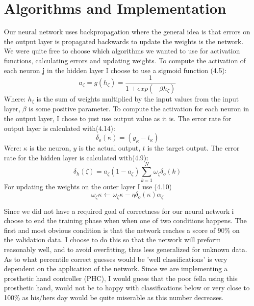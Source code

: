 \documentclass[a4paper, norsk, 12pt]{article}
\begin{document}
\section{Algorithms and Implementation}
Our neural network uses backpropagation where the general idea is that errors on the output layer is propagated backwards to update the weights is the network. We were quite free to choose which algorithms we wanted to use for activation functions, calculating errors and updating weights. To compute the activation of each neuron \textbf{j} in the hidden layer I choose to use a sigmoid function (4.5): 
$$ a_ \zeta  =  g(h_\zeta) = \frac{\mathrm{1} }{\mathrm{1} + exp(- \beta h_\zeta ) }  $$
Where: \newline
$h_\zeta$ is the sum of weights multiplied by the input values from the input layer, \newline$\beta$ is some positive parameter.\newline \newline
\noindent To compute the activation for each neuron in the output layer, I chose to just use output value as it is.\newline
The error rate for output layer is calculated with(4.14):
$$ \delta_o(\kappa) = (y_\kappa - t_\kappa) $$
Were: \newline 
$\kappa$ is the neuron,\newline
$y$ is the actual output,\newline
$t$ is the target output.\newline 
The error rate for the hidden layer is calculated with(4.9):
$$ \delta_h(\zeta) = a_\zeta(1-a_\zeta)\sum_{k=1}^N \omega_\zeta\delta_o(k) $$
For updating the weights on the outer layer I use (4.10)
$$ \omega_\zeta\kappa \leftarrow \omega_\zeta\kappa - \eta\delta_o (\kappa)\alpha_\zeta  $$
\newline

\noindent Since we did not have a required goal of correctness for our neural network i choose to end the training phase when when one of two conditions happens. The first and most obvious condition is that the network reaches a score of 90\% on the validation data. I choose to do this so that the network will preform reasonably well, and to avoid overfitting, thus less generalized for unknown data. As to what percentile correct guesses would be 'well classifications' is very dependent on the application of the network. Since we are implementing a prosthetic hand controller (PHC), I would guess that the poor fella using this prosthetic hand, would not be to happy with classifications below or very close to 100\% as his/hers day would be quite miserable as this number decreases.\newline\newline
\end{document}
